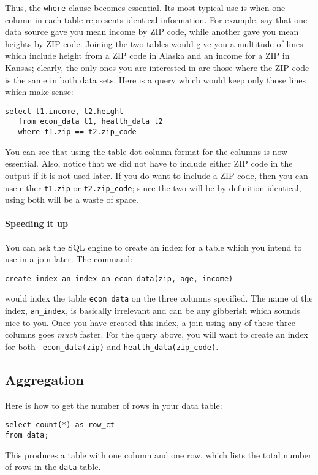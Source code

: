Thus, the {\tt where} clause becomes essential. Its most typical use is
when one column in each table represents identical information. For
example, say that one data source gave you mean income by ZIP code,
while another gave you mean heights by ZIP code. Joining the two tables
would give you a multitude of lines which include height from a ZIP code
in Alaska and an income for a ZIP in Kansas; clearly, the only ones you
are interested in are those where the ZIP code is the same in both data
sets. Here is a query which would keep only those lines which make
sense:

\begin{verbatim}
select t1.income, t2.height
   from econ_data t1, health_data t2
   where t1.zip == t2.zip_code
\end{verbatim}

You can see that using the table-dot-column format for the columns is now
essential. Also, notice that we did not have to include either ZIP code
in the output if it is not used later. If you do want to include a ZIP
code, then you can use either {\tt t1.zip} or {\tt t2.zip\_code}; since
the two will be by definition identical, using both will be a waste of
space.

\paragraph{Speeding it up}
You can ask the SQL engine to create an index for a table which you
intend to use in a join later. The command:
\begin{verbatim}
create index an_index on econ_data(zip, age, income)
\end{verbatim}
would index the table {\tt econ\_data} on the three columns specified.
The name of the index, {\tt an\_index}, is basically irrelevant and can
be any gibberish which sounds nice to you. Once you have created this
index, a join using any of these three columns goes {\sl much} faster.
For the query above, you will want to create an index for both {\tt
econ\_data(zip)} and {\tt health\_data(zip\_code)}.

\subsection{Aggregation}
Here is how to get the number of rows in your data table:
\begin{verbatim}
select count(*) as row_ct 
from data;
\end{verbatim}
This produces a table with one column and one row, which lists the total number of rows in the {\tt data} table.

